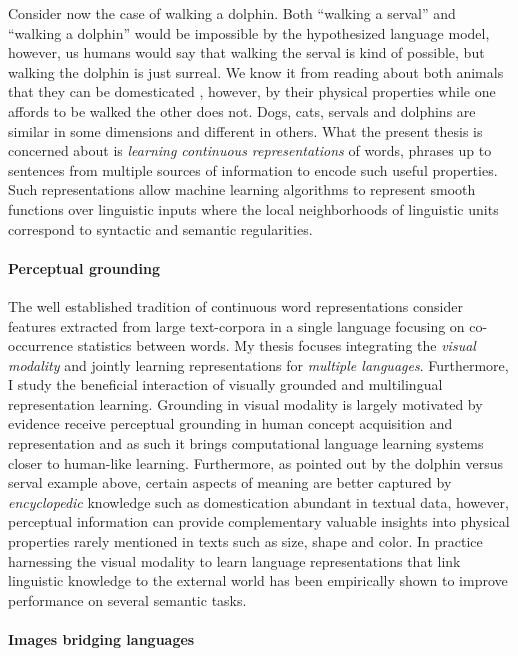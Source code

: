 Consider now the case of walking a dolphin.
Both ``walking a serval'' and ``walking a dolphin'' would be impossible
by the hypothesized language model, however, us humans would say that walking the serval is
kind of possible, but walking the dolphin is just surreal.
We know it from reading about both animals that they can be domesticated
, however, by their physical properties while one affords to be walked
the other does not. Dogs, cats, servals and dolphins are similar in some
dimensions and different in others.
What the present thesis is concerned about is
\emph{learning continuous representations} of words, phrases up to sentences
from multiple sources of information to encode such useful properties.
Such representations allow machine learning algorithms to represent smooth
functions over linguistic inputs where the local neighborhoods of linguistic
units correspond to syntactic and semantic regularities.

\paragraph{Perceptual grounding}

The well established tradition of continuous word representations consider
features extracted from large text-corpora in a single language focusing on
co-occurrence statistics between words.
My thesis focuses integrating the \emph{visual modality} and jointly learning representations for
\emph{multiple languages}. Furthermore, I study the beneficial interaction of
visually grounded and multilingual representation learning.
Grounding in visual modality is largely motivated by evidence receive
perceptual grounding in human concept acquisition and representation \citep{barsalou2003grounding} and as such
it brings computational language learning systems closer to human-like learning.
Furthermore, as pointed out by the dolphin versus serval example above,
certain aspects of meaning are better captured by \emph{encyclopedic}
knowledge such as domestication abundant in textual data, however, perceptual information
can provide complementary valuable insights into physical properties rarely mentioned in texts such as size,
shape and color. In practice harnessing the visual modality to learn language
representations that link linguistic knowledge
to the external world \citep{kiela2014improving,baroni2016grounding,elliott2017imagination,kiela2017learning,yoo2017improving}
has been empirically shown to improve performance on several semantic tasks.

\paragraph{Images bridging languages}

